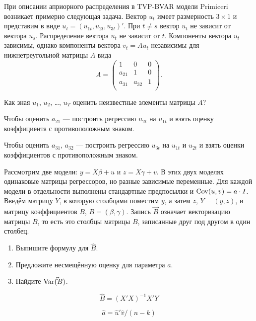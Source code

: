 \begin{problem}
При описании априорного распределения в TVP-BVAR модели Primiceri возникает примерно следующая задача. Вектор $u_t$ имеет размерность $3\times 1$ и представим в виде $u_t = (u_{1t}, u_{2t}, u_{3t})'$. При $t \neq s$ вектор $u_t$ не зависит от вектора $u_s$. Распределение вектора $u_t$ не зависит от $t$. Компоненты вектора $u_t$ зависимы, однако компоненты вектора $v_t = Au_t$ независимы для нижнетреугольной матрицы $A$ вида
\[
A = \begin{pmatrix}
1      & 0      & 0 \\
a_{21} & 1      & 0 \\
a_{31} & a_{32} & 1 \\
\end{pmatrix}.
\]

Как зная $u_1$, $u_2$, \ldots, $u_T$ оценить неизвестные элементы матрицы $A$?
\begin{sol}
Чтобы оценить $a_{21}$ — построить регрессию $u_{2t}$ на $u_{1t}$ и взять оценку коэффициента с противоположным знаком.

Чтобы оценить $a_{31}$, $a_{32}$ — построить регрессию $u_{3t}$ на $u_{1t}$ и $u_{2t}$ и взять оценки коэффициентов с противоположным знаком.
\end{sol}
\end{problem}

\begin{problem}
Рассмотрим две модели: $y = X\beta + u$ и $z = X\gamma + v$. В этих двух моделях одинаковые матрицы регрессоров, но разные зависимые переменные. Для каждой модели в отдельности выполнены стандартные предпосылки и $\operatorname{Cov}(u, v) = a \cdot I$. Введём матрицу $Y$, в которую столбцами поместим $y$, а затем $z$, $Y = (y, z)$, и матрицу коэффициентов $B$, $B=(\beta, \gamma)$. Запись $\vec B$ означает векторизацию матрицы $B$, то есть это столбцы матрицы $B$, записанные друг под другом в один столбец.
\begin{enumerate}
\item Выпишите формулу для $\hat B$.
\item Предложите несмещённую оценку для параметра $a$.
\item Найдите $\operatorname{Var}(\vec\hat B)$.
\end{enumerate}
\begin{sol}
\[
\hat B = (X'X)^{-1}X'Y
\]

\[
\hat a = \hat u' \hat v / (n - k)
\]
\end{sol}
\end{problem}

